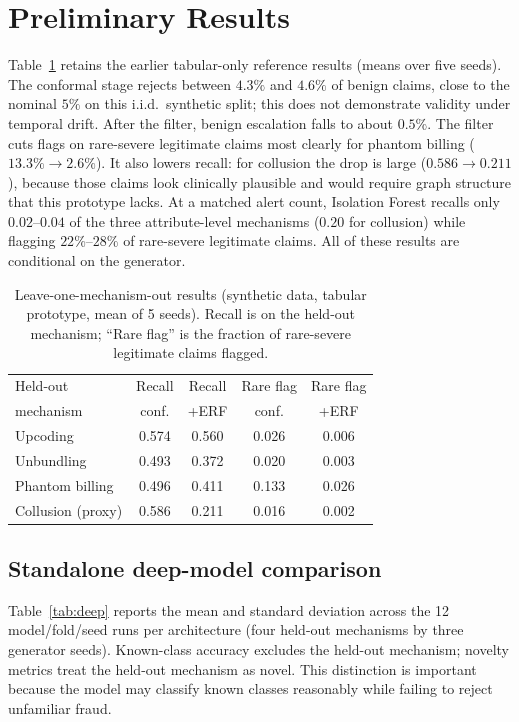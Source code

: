 \documentclass[conference]{IEEEtran}
\begin{document}
\section{Preliminary Results}
Table~\ref{tab:res} retains the earlier tabular-only reference results (means over five seeds). The conformal stage rejects between $4.3\%$ and $4.6\%$ of benign claims, close to the nominal $5\%$ on this i.i.d.\ synthetic split; this does not demonstrate validity under temporal drift. After the filter, benign escalation falls to about $0.5\%$. The filter cuts flags on rare-severe legitimate claims most clearly for phantom billing ($13.3\%\to2.6\%$). It also lowers recall: for collusion the drop is large ($0.586\to0.211$), because those claims look clinically plausible and would require graph structure that this prototype lacks. At a matched alert count, Isolation Forest recalls only $0.02$--$0.04$ of the three attribute-level mechanisms ($0.20$ for collusion) while flagging $22\%$--$28\%$ of rare-severe legitimate claims. All of these results are conditional on the generator.

\begin{table}[t]
\caption{Leave-one-mechanism-out results (synthetic data, tabular prototype, mean of 5 seeds). Recall is on the held-out mechanism; ``Rare flag'' is the fraction of rare-severe legitimate claims flagged.}
\label{tab:res}
\centering
\small
\begin{tabular}{lcccc}
\toprule
Held-out & Recall & Recall & Rare flag & Rare flag\\
mechanism & conf. & +ERF & conf. & +ERF\\
\midrule
Upcoding & 0.574 & 0.560 & 0.026 & 0.006\\
Unbundling & 0.493 & 0.372 & 0.020 & 0.003\\
Phantom billing & 0.496 & 0.411 & 0.133 & 0.026\\
Collusion (proxy) & 0.586 & 0.211 & 0.016 & 0.002\\
\bottomrule
\end{tabular}
\end{table}

\subsection{Standalone deep-model comparison}
Table~\ref{tab:deep} reports the mean and standard deviation across the 12 model/fold/seed runs per architecture (four held-out mechanisms by three generator seeds). Known-class accuracy excludes the held-out mechanism; novelty metrics treat the held-out mechanism as novel. This distinction is important because the model may classify known classes reasonably while failing to reject unfamiliar fraud.
\end{document}
